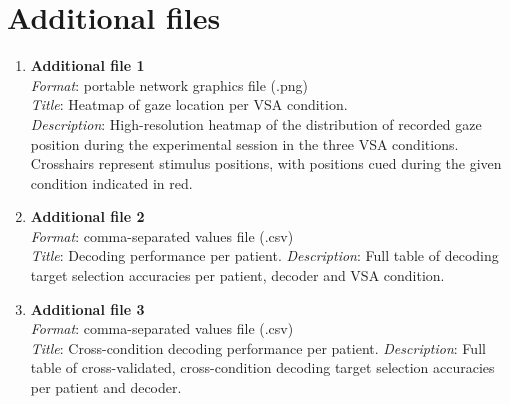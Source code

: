 \documentclass{article}
\begin{document}
\section*{Additional files}

\begin{enumerate}
	\item \textbf{Additional file 1} \\
	      \emph{Format}: portable network graphics file (.png) \\
	      \emph{Title}: Heatmap of gaze location per VSA condition.\\
	      \emph{Description}: High-resolution heatmap of the distribution of recorded
	      gaze position during the experimental session in the three VSA
	      conditions.
	      Crosshairs represent stimulus positions, with positions
	      cued during the given condition indicated in red.
	\item \textbf{Additional file 2} \\
	      \emph{Format}: comma-separated values file (.csv) \\
	      \emph{Title}: Decoding performance per patient.
	      \emph{Description}: Full table of decoding target selection accuracies
	      per patient, decoder and VSA condition.
	\item \textbf{Additional file 3} \\
	      \emph{Format}: comma-separated values file (.csv) \\
	      \emph{Title}: Cross-condition decoding performance per patient.
	      \emph{Description}: Full table of cross-validated, cross-condition
	      decoding target selection accuracies per patient and decoder.
\end{enumerate}


\printbibliography

%
\end{document}
